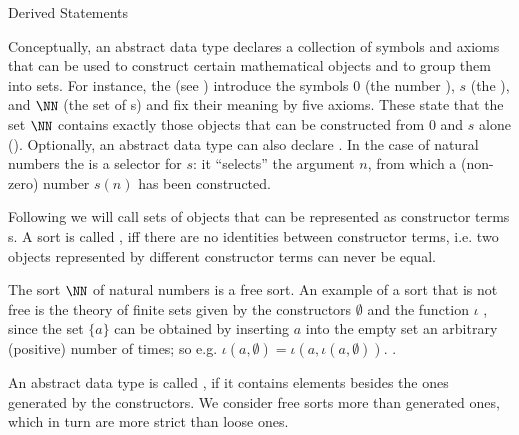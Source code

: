 \begin{omgroup}{Derived Statements}
\begin{module}[id=adt]
\begin{omgroup}[id=adt,short=Abstract Data Types]
\begin{module}[id=adt]
\begin{omtext}
  Conceptually, an abstract data type declares a collection of symbols and axioms that can
  be used to construct certain mathematical objects and to group them into sets. For
  instance, the {} (see {}) introduce the symbols
  $0$ (the number {}), $s$ (the {}), and $\NN$
  (the set of {s}) and fix their meaning by five axioms. These
  state that the set $\NN$ contains exactly those objects that can be constructed from $0$
  and $s$ alone (). Optionally, an abstract data
  type can also declare . In the case of natural numbers the
  {} is a selector for $s$: it ``selects'' the argument
  $n$, from which a (non-zero) number $s(n)$ has been constructed.
\end{omtext}

\begin{definition}[display=flow,id=free.def]
  Following {\casl} we will call sets of objects that can be represented as constructor
  terms {s}. A sort is called {}, iff there are no identities
  between constructor terms, i.e.  two objects represented by different constructor terms
  can never be equal.
\end{definition}

\begin{omtext}
  The sort $\NN$ of natural numbers is a free sort. An example of a sort that is not free
  is the theory of finite sets given by the constructors $\emptyset$ and the
  {} function $\iota$ , since the set $\{a\}$ can be obtained by
  inserting $a$ into the empty set an arbitrary (positive) number of times; so
  e.g. $\iota(a,\emptyset)=\iota(a,\iota(a,\emptyset))$. .
\end{omtext}

\begin{definition}[display=flow,id=generated.def]
  An abstract data type is called {}, if it contains elements besides the
  ones generated by the constructors. We consider free sorts more {} than
  generated ones, which in turn are more strict than loose ones.
\end{definition}


\end{module}
\end{omgroup}
\end{module}
\end{omgroup}

